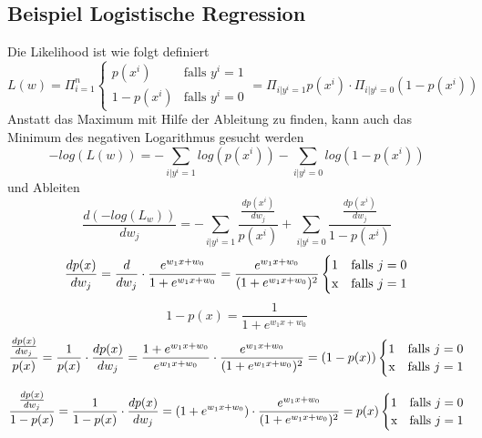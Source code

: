 \documentclass{report}
\begin{document}
  \subsection{Beispiel Logistische Regression}	
  Die Likelihood ist wie folgt definiert	
  \begin{equation*}	
  L(w) = \Pi_{i=1}^n 	
  \begin{cases}	
    p(x^i) & \text{falls $y^i = 1$}\\	
    1 - p(x^i) & \text{falls $y^i = 0$}	
  \end{cases} = \Pi_{i | y^i=1}p(x^i) \cdot \Pi_{i | y^i = 0}(1 - p(x^i))	
  \end{equation*}	
  Anstatt das Maximum mit Hilfe der Ableitung zu finden, kann auch das Minimum des negativen Logarithmus gesucht werden	
  \begin{equation*}	
    -log(L(w)) = -\sum_{i|y^i = 1}log(p(x^i)) - \sum_{i | y^i = 0}log(1 - p(x^i))	
  \end{equation*}	
  und Ableiten	
  $$\frac{d(-log(L_w))}{dw_j} = - \sum_{i|y^i = 1} \frac{\frac{dp(x^i)}{dw_j}}{p(x^i)} + \sum_{i|y^i = 0} \frac{\frac{dp(x^i)}{dw_j}}{1 - p(x^i)}$$	
  \begin{equation*}	
    \frac{dp(x)}{dw_j} = \frac{d}{dw_j}\cdot \frac{e^{w_1x + w_0}}{1 + e^{w_1x + w_0}} = \frac{e^{w_1x + w_0}}{(1 + e^{w_1x + w_0})^2}	
    \begin{cases}	
      1 & \text{falls $j = 0$}\\	
      $x$ & \text{falls $j = 1$}	
    \end{cases}	
  \end{equation*}	
  $$1 - p(x) = \frac{1}{1 + e^{w_1x + w_0}}$$	
  \begin{equation*}	
    \frac{\frac{dp(x)}{dw_j}}{p(x)} = \frac{1}{p(x)}\cdot \frac{dp(x)}{dw_j} = 	
    \frac{1 + e^{w_1x + w_0}}{e^{w_1x + w_0}}\cdot \frac{e^{w_1x + w_0}}{(1 + e^{w_1x + w_0})^2} = (1 - p(x))	
    \begin{cases}	
      1 & \text{falls $j = 0$}\\	
      $x$ & \text{falls $j = 1$}	
    \end{cases}	
  \end{equation*}	
  
  \begin{equation*}	
    \frac{\frac{dp(x)}{dw_j}}{1 - p(x)} = \frac{1}{1 - p(x)}\cdot \frac{dp(x)}{dw_j}	
    = (1 + e^{w_1x + w_0})\cdot \frac{e^{w_1x + w_0}}{(1 + e^{w_1x + w_0})^2} = p(x)	
    \begin{cases}	
      1 & \text{falls $j = 0$}\\	
      $x$ & \text{falls $j = 1$}	
    \end{cases}	
  \end{equation*}	
  
\end{document}
